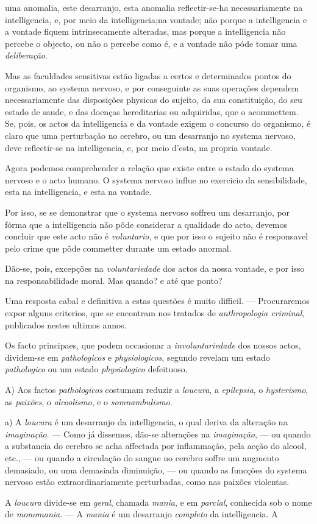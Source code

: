 uma anomalia, este desarranjo, esta anomalia reflectir-se-ha necessariamente na intelligencia, e, por meio da intelligencia;na vontade; não porque a intelligencia e a vontade fiquem intrinsecamente alteradas, mas porque a intelligencia não percebe o objecto, ou não o percebe como é, e a vontade não póde tomar uma \emph{deliberação}.\par Mas as faculdades sensitivas estão ligadas a certos e determinados pontos do organismo, ao systema nervoso, e por conseguinte as suas operações dependem necessariamente das disposições physicas do sujeito, da sua constituição, do seu estado de saude, e das doenças hereditarias ou adquiridas, que o acommettem. Se, pois, os actos da intelligencia e da vontade exigem o concurso do organismo, é claro que uma perturbação no cerebro, ou um desarranjo no systema nervoso, deve reflectir-se na intelligencia, e, por meio d'esta, na propria vontade.\par Agora podemos comprehender a relação que existe entre o estado do systema nervoso e o acto humano. O systema nervoso influe no exercicio da sensibilidade, esta na intelligencia, e esta na vontade.\par Por isso, se se demonstrar que o systema nervoso soffreu um desarranjo, por fórma que a intelligencia não pôde considerar a qualidade do acto, devemos concluir que este acto não é \emph{voluntario}, e que por isso o sujeito não é responsavel pelo crime que pôde commetter durante um estado anormal.\par Dão-se, pois, excepções na \emph{voluntariedade} dos actos da nossa vontade, e por isso na responsabilidade moral. Mas quando? e até que ponto?\par Uma resposta cabal e definitiva a estas questões é muito difficil. --- Procuraremos expor alguns criterios, que se encontram nos tratados de \emph{anthropologia criminal}, publicados nestes ultimos annos.\par *\par Os facto principaes, que podem occasionar a \emph{involuntariedade} dos nossos actos, dividem-se em \emph{pathologicos} e \emph{physiologicos}, segundo revelam um estado \emph{pathologico} ou um estado \emph{physiologico} defeituoso.\par A) Aos factos \emph{pathologicos} costumam reduzir a \emph{loucura}, a \emph{epilepsia}, o \emph{hysterismo}, as \emph{paixões}, o \emph{alcoolismo}, e o \emph{somnambulismo}.\par a) A \emph{loucura} é um desarranjo da intelligencia, o qual deriva da alteração na \emph{imaginação}. --- Como já dissemos, dão-se alterações na \emph{imaginação}, --- ou quando a substancia do cerebro se acha affectada por inflammação, pela acção do alcool, etc., --- ou quando a circulação do sangue no cerebro soffre um augmento demasiado, ou uma demasiada diminuição, --- ou quando as funcções do systema nervoso estão extraordinariamente perturbadas, como nas paixões violentas.\par A \emph{loucura} divide-se em \emph{geral}, chamada \emph{mania}, e em \emph{parcial}, conhecida sob o nome de \emph{monomania}. --- A \emph{mania} é um desarranjo \emph{completo} da intelligencia. A 